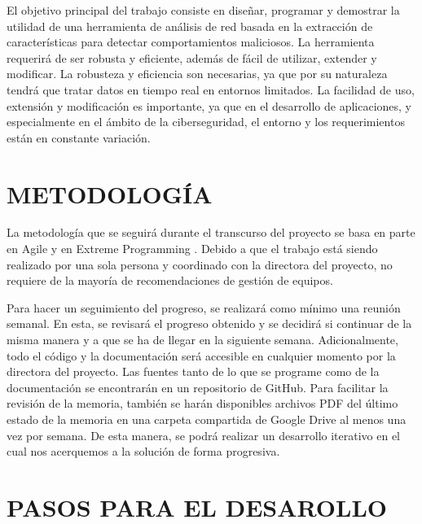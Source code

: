 El objetivo principal del trabajo consiste en diseñar, programar y demostrar la utilidad de una herramienta de análisis de red basada en la extracción de características para detectar comportamientos maliciosos. La herramienta requerirá de ser robusta y eficiente, además de fácil de utilizar, extender y modificar. La robusteza y eficiencia son necesarias, ya que por su naturaleza tendrá que tratar datos en tiempo real en entornos limitados. La facilidad de uso, extensión y modificación es importante, ya que en el desarrollo de aplicaciones, y especialmente en el ámbito de la ciberseguridad, el entorno y los requerimientos están en constante variación.

\color{blue}  %
\section*{METODOLOGÍA}

La metodología que se seguirá durante el transcurso del proyecto se basa en parte en Agile y en Extreme Programming \cite{extremeprogramming}. Debido a que el trabajo está siendo realizado por una sola persona y coordinado con la directora del proyecto, no requiere de la mayoría de recomendaciones de gestión de equipos. 

Para hacer un seguimiento del progreso, se realizará como mínimo una reunión semanal. En esta, se revisará el progreso obtenido y se decidirá si continuar de la misma manera y a que se ha de llegar en la siguiente semana. Adicionalmente, todo el código y la documentación será accesible en cualquier momento por la directora del proyecto. Las fuentes tanto de lo que se programe como de la documentación se encontrarán en un repositorio de GitHub. Para facilitar la revisión de la memoria, también se harán disponibles archivos PDF del último estado de la memoria en una carpeta compartida de Google Drive al menos una vez por semana. De esta manera, se podrá realizar un desarrollo iterativo en el cual nos acerquemos a la solución de forma progresiva.

\color{black}  %

\section*{PASOS PARA EL DESAROLLO}

